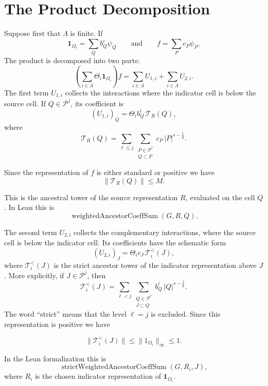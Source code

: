 \documentclass[11pt]{article}
\newcommand{\Pcal}{\mathcal P}
\newcommand{\Tcal}{\mathcal T}
\newcommand{\Om}{\Omega}
\newcommand{\1}{\mathbf 1}
\begin{document}
\section*{The Product Decomposition}

Suppose first that $\Lambda$ is finite. If 
\[
  \1_{\Om_i}
  =
  \sum_Q b^i_Q\psi_Q
  \qquad\text{and}\qquad
  f
  =
  \sum_P c_P\psi_P.
\]
The product is decomposed into two parts:
\[
 \left(  \sum_{i\in \Lambda} \Theta_i \1_{\Om_i}\right) f=\sum_{i\in \Lambda}  U_{1,i}+\sum_{i\in \Lambda} U_{2,i}.
\]
The first term \(U_{1,i}\) collects the interactions where the indicator cell is
below the source cell.  If \(Q\in\Pcal^j\), its coefficient is
\begin{equation}\label{eq:u1-coeff}
  (U_{1,i})_Q
  =
  \Theta_i b^i_Q\,\Tcal_R(Q),
\end{equation}
where
\begin{equation}\label{eq:tower}
  \Tcal_R(Q) =
  \sum_{\ell\le j}
  \sum_{\substack{P\in\Pcal^\ell\\ Q\subset P}}
  c_P\,|P|^{s-\frac1p}.\end{equation}

Since the representation of $f$ is either standard or positive  we have 
$$\|\Tcal_R(Q)\|\leq M.$$


This is the ancestral tower of the source representation \(R\), evaluated on
the cell \(Q\).  In Lean this is
\[
  \operatorname{weightedAncestorCoeffSum}(G,R,Q).
\]

The second term \(U_{2,i}\) collects the complementary interactions, where the
source cell is below the indicator cell.  Its coefficients have the schematic
form
\begin{equation}\label{eq:u2-coeff}
  (U_{2,i})_J
  =
   \Theta_i c_J\,\Tcal_i^{<}(J),
\end{equation}
where \(\Tcal_i^{<}(J)\) is the strict ancestor tower of the indicator
representation above \(J\).  More explicitly, if \(J\in\Pcal^j\), then
\begin{equation}\label{eq:strict-indicator-tower}
  \Tcal_i^{<}(J)
  =
  \sum_{\ell<j}
  \sum_{\substack{Q\in\Pcal^\ell\\ J\subset Q}}
  b^i_Q\,|Q|^{s-\frac1p}.
\end{equation}
The word ``strict'' means that the level \(\ell=j\) is excluded. Since this representation is positive we have 

$$\| \Tcal_i^{<}(J)\|\leq \|1_{\Omega_i}\|_\infty\leq 1.$$


 In the Lean
formalization this is
\[
  \operatorname{strictWeightedAncestorCoeffSum}(G,R_i,J),
\]
where \(R_i\) is the chosen indicator representation of \(\1_{\Om_i}\).
\end{document}
